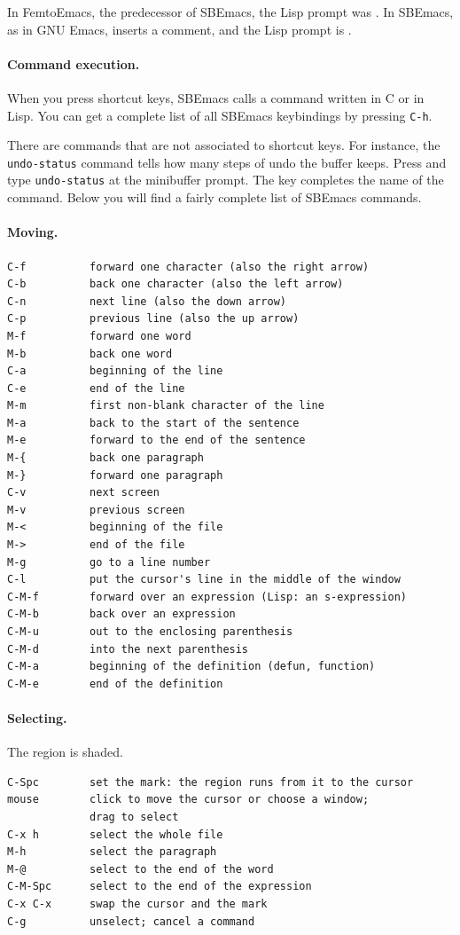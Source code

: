 \documentclass[a4paper,12pt,openany]{book}
\begin{document}
In FemtoEmacs, the predecessor of SBEmacs, the Lisp prompt was
\keys{;}. In SBEmacs,
as in GNU Emacs, \keys{;} inserts a comment, and the Lisp
prompt is \keys{:}.

\paragraph{Command execution.} When you press
shortcut keys, SBEmacs calls a command written in
C or in Lisp. You can get a complete list of all
SBEmacs keybindings by pressing \verb|C-h|.

There are commands that are not associated to
shortcut keys.
For instance, the \verb|undo-status| command
tells how many steps of undo the buffer keeps.
Press 
and type \verb|undo-status| at the
minibuffer prompt. The  key completes the name of
the command. Below you will find a fairly complete list
of SBEmacs commands.

\paragraph{Moving.}
\begin{verbatim}
C-f          forward one character (also the right arrow)
C-b          back one character (also the left arrow)
C-n          next line (also the down arrow)
C-p          previous line (also the up arrow)
M-f          forward one word
M-b          back one word
C-a          beginning of the line
C-e          end of the line
M-m          first non-blank character of the line
M-a          back to the start of the sentence
M-e          forward to the end of the sentence
M-{          back one paragraph
M-}          forward one paragraph
C-v          next screen
M-v          previous screen
M-<          beginning of the file
M->          end of the file
M-g          go to a line number
C-l          put the cursor's line in the middle of the window
C-M-f        forward over an expression (Lisp: an s-expression)
C-M-b        back over an expression
C-M-u        out to the enclosing parenthesis
C-M-d        into the next parenthesis
C-M-a        beginning of the definition (defun, function)
C-M-e        end of the definition
\end{verbatim}

\paragraph{Selecting.} The region is shaded.
\begin{verbatim}
C-Spc        set the mark: the region runs from it to the cursor
mouse        click to move the cursor or choose a window;
             drag to select
C-x h        select the whole file
M-h          select the paragraph
M-@          select to the end of the word
C-M-Spc      select to the end of the expression
C-x C-x      swap the cursor and the mark
C-g          unselect; cancel a command
\end{verbatim}
\end{document}
